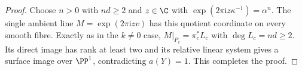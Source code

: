 \begin{proof}
Choose $n>0$ with $nd\ge2$ and $z\in\C$ with
$\exp(2\pi\mathrm i z\kappa^{-1})=\alpha^n$.
The single ambient line $M=\exp(2\pi\mathrm i z v)$
has this quotient coordinate on every smooth fibre.
Exactly as in the $k\ne0$ case,
$M|_{P_c}=\pi_c^*L_c$ with $\deg L_c=nd\ge2$.
Its direct image has rank at least two and its relative
linear system gives a surface image over $\PP^1$,
contradicting $a(Y)=1$. This completes the proof.
\end{proof}



